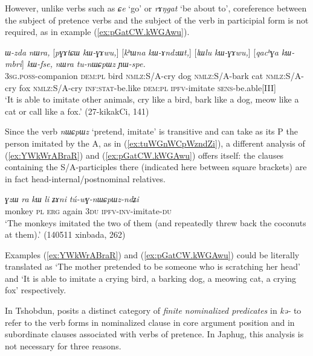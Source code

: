 \documentclass[oneside,a4paper,11pt]{article}
\newcommand{\ipa}[1]{\textit{\phon#1}}
\newcommand{\jpg}[2]{\ipa{#1} `#2'}
\begin{document}
However, unlike verbs such as \jpg{ɕe}{go} or \jpg{rɤŋgat}{be about to},  coreference between the subject of pretence verbs and the subject of the verb in participial form is not required, as in example (\ref{ex:pGatCW.kWGAwu}).

\begin{exe}
\ex \label{ex:pGatCW.kWGAwu}
\gll  \ipa{ɯ-zda} 	\ipa{nɯra,} 	[\ipa{pɣɤtɕɯ} 	\ipa{kɯ-ɣɤwu,}] 	[\ipa{kʰɯna} 	\ipa{kɯ-ɤndzɯt,}] 	[\ipa{lɯlu} 	\ipa{kɯ-ɣɤwu,}] 	[\ipa{qacʰɣa} 	\ipa{kɯ-mbri}] 	\ipa{kɯ-fse,} 	\ipa{nɯra} 	\ipa{tu-nɯɕpɯz} 	\ipa{ɲɯ-spe.} \\
\textsc{3sg.poss}-companion \textsc{dem:pl} bird \textsc{nmlz}:S/A-cry dog \textsc{nmlz}:S/A-bark cat \textsc{nmlz}:S/A-cry fox \textsc{nmlz}:S/A-cry \textsc{inf:stat}-be.like \textsc{dem:pl} \textsc{ipfv}-imitate \textsc{sens}-be.able[III] \\
\glt `It is able to imitate other animals, cry like a bird, bark like a dog, meow like a cat or call like a fox.' (27-kikakCi, 141)
\end{exe}

Since the verb \jpg{nɯɕpɯz}{pretend, imitate} is transitive and can take as its P the person imitated by the A, as in (\ref{ex:tuWGnWCpWzndZi}), a different analysis of (\ref{ex:YWkWrABraR}) and (\ref{ex:pGatCW.kWGAwu}) offers itself: the clauses containing the S/A-participles there (indicated here between square brackets) are in fact head-internal/postnominal relatives.

\begin{exe}
\ex \label{ex:tuWGnWCpWzndZi}
\gll \ipa{ɣzɯ} 	\ipa{ra} 	\ipa{kɯ} 	\ipa{li} 	\ipa{ʑɤni} 	\ipa{tú-wɣ-nɯɕpɯz-ndʑi} \\
monkey \textsc{pl} \textsc{erg} again \textsc{3du} \textsc{ipfv-inv}-imitate-\textsc{du} \\
\glt `The monkeys imitated the two of them (and repeatedly threw back the coconuts at them).' (140511 xinbada, 262)
\end{exe} 

Examples (\ref{ex:YWkWrABraR}) and (\ref{ex:pGatCW.kWGAwu}) could be literally translated as `The mother pretended to be someone who is scratching her head' and `It is able to imitate a crying bird, a barking dog, a meowing cat, a crying fox' respectively. 

In Tshobdun, \citet[481-2]{sun12complementation} posits a distinct category of \textit{finite nominalized predicates} in \ipa{kə-} to refer to the verb forms in nominalized clause in core argument position and in subordinate clauses associated with verbs of pretence. In Japhug, this analysis is not necessary for three reasons. 
\end{document}
